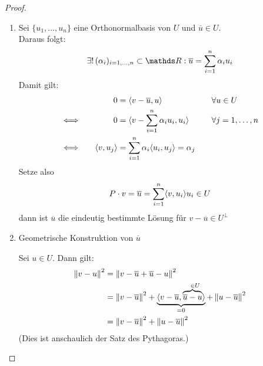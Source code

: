 \begin{proof}~
  \begin{enumerate}[1)]
  \item Sei $\{u_1, \dots , u_n \}$ eine Orthonormalbasis von $U$ 
    und $\overline{u}\in U $. \\
    Daraus folgt:
    \begin{gather*}
      \exists ! \, (\alpha_i)_{i=1,\dotsc,n} \subset \R: \overline{u} = \sum_{i=1}^{n} \alpha_i u_i
    \end{gather*}
    Damit gilt:
    \begin{alignat*}{3}
      &&0 &= \langle v-\overline{u}, u \rangle &\quad& \forall u \in U \\
      &\Longleftrightarrow \quad& 0 &= \langle v- \sum_{i=1}^{n} \alpha_i u_i, u_i \rangle &\quad &\forall j=1, \dots , n\\
      &\Longleftrightarrow  & \langle v, u_j \rangle &= \sum_{i=1}^{n} \alpha_i \langle u_i, u_j \rangle = \alpha_j
    \end{alignat*}
    Setze also 
    \begin{gather}
      P\cdot v = \overline{u}
               = \sum_{i=1}^{n} \scp{v}{u_i} u_i \in U
                 \label{IV.3.4}
    \end{gather}
    dann ist $\overline{u}$ die eindeutig bestimmte Lösung für $ v-\overline{u} \in U^\bot$
    \item
    \begin{image}{Geometrische Konstruktion von $\overline{u}$}
    \end{image}
Sei  $u\in U$. Dann gilt:
    \begin{align}
      \nonumber
      \nn[v-u]^2 &= \nn[v-\overline{u}+\overline{u} -u]^2 \\ \nonumber
                 &= \nn[v-\overline{u}]^2 +
                   \underbrace{\scp{v-\overline{u}}{\overbrace{\overline{u}-u}^{~~\in U}}}_{=0}
                   + \nn[u-\overline{u}]^2 \\
                 &= \nn[v-\overline{u}]^2 + \nn[u-\overline{u}]^2
                   \label{IV.3.5}
    \end{align}
    (Dies ist anschaulich der Satz des Pythagoras.)
  \end{enumerate}
\end{proof}


